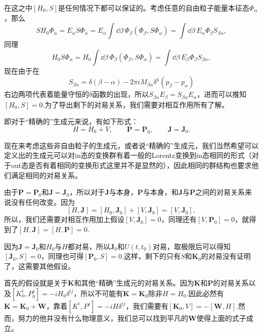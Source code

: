 在这之中$[H_0,S]$是任何情况下都可以保证的。考虑任意的自由粒子能量本征态$\Phi_\alpha$，那么
\[
	SH_0\Phi_\alpha=E_\alpha S\Phi_\alpha=E_\alpha\int \dd \beta\, \Phi_\beta(\Phi_\beta,S\Phi_\alpha)=\int \dd \beta\, E_\alpha\Phi_\beta S_{\beta\alpha},
\]
同理
\[
	H_0S\Phi_\alpha=H_0\int \dd \beta\, \Phi_\beta(\Phi_\beta,S\Phi_\alpha)=\int \dd \beta\, E_\beta \Phi_\beta S_{\beta\alpha},
\]
现在由于在
\[
S_{\beta\alpha}=\delta(\beta-\alpha)-2\pi iM_{\beta\alpha}\delta^4(p_\beta-p_\alpha)
\]
右边两项代表着能量守恒的$\delta$函数的出现，所以$S_{\beta\alpha}E_\beta=S_{\beta\alpha}E_\alpha$，进而可以推知$[H_0,S]=0$.为了导出剩下的对易关系，我们需要对相互作用所有了解。

即对于“精确的”生成元来说，有如下形式：
\[
H=H_0+V,\qquad \bm{P}=\bm{P}_0,\qquad\bm{J}=\bm{J}_0.
\]

现在来考虑这些非自由粒子的生成元，或者说“精确的”生成元，我们当然希望可以定义出的生成元可以对in态的变换群有着一般的Lorentz变换到in态相同的形式（对于out态是否有着相同的变换形式这里并不是显然的），因此相同的群结构也要求他们满足相同的对易关系。

由于$\bm{P}=\bm{P}_0$和$\bm{J}=\bm{J}_0$，所以对于$\bm{J}$与本身，$\bm{P}$与本身，和$\bm{J}$与$\bm{P}$之间的对易关系来说没有任何改变。因为
\[
	[H,\bm{J}]=[H_0,\bm{J}_0]+[V,\bm{J}_0]=[V,\bm{J}_0],
\]
所以，我们还需要对相互作用加上假设$[V,\bm{J}_0]=0$，同理还有$[V,\bm{P}_0]=0$，就得到了$[H,\bm{J}]=[H,\bm{P}]=0$.

因为$\bm{J}=\bm{J}_0$和$H_0$与$H$都对易，所以$\bm{J}_0$和$U(t,t_0)$对易，取极限后可以得知$[\bm{J}_0,S]=0$，同理也可得$[\bm{P}_0,S]=0$.这样，剩下的只有$S$和$\bm{K}_0$的对易没有证明了，这需要其他假设。

首先的假设就是关于$\bm{K}$和其他“精确”生成元的对易关系。因为$\bm{K}$和$\bm{P}$的对易关系以及$[K^i_0,P^j_0]=-iH_0\delta^{ij}$，所以不可能有$\bm{K}=\bm{K}_0$除非$H=H_0$.因此必然有$\bm{K}=\bm{K}_0+\bm{W}$，靠着$[K^i,P^j]=-iH\delta^{ij}$，我们需要有$[\bm{K}_0,V]=-[\bm{W},H]$.然而，努力的他并没有什么物理意义，我们总可以找到平凡的$\bm{W}$使得上面的式子成立。

